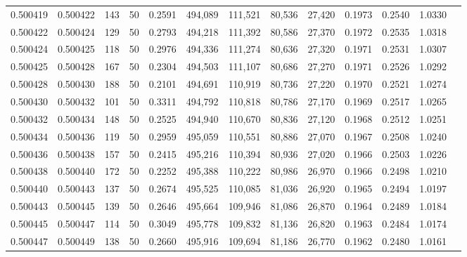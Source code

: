 \begin{tabular}{rrrrrrrrrrrrr}
0.500419 & 0.500422 & 143 &  50 &                                     0.2591 & 494,089 & 111,521 &  80,536 &  27,420 & 0.1973 & 0.2540 & 1.0330 \\
0.500422 & 0.500424 & 129 &  50 &                                     0.2793 & 494,218 & 111,392 &  80,586 &  27,370 & 0.1972 & 0.2535 & 1.0318 \\
0.500424 & 0.500425 & 118 &  50 &                                     0.2976 & 494,336 & 111,274 &  80,636 &  27,320 & 0.1971 & 0.2531 & 1.0307 \\
0.500425 & 0.500428 & 167 &  50 &                                     0.2304 & 494,503 & 111,107 &  80,686 &  27,270 & 0.1971 & 0.2526 & 1.0292 \\
0.500428 & 0.500430 & 188 &  50 &                                     0.2101 & 494,691 & 110,919 &  80,736 &  27,220 & 0.1970 & 0.2521 & 1.0274 \\
0.500430 & 0.500432 & 101 &  50 &                                     0.3311 & 494,792 & 110,818 &  80,786 &  27,170 & 0.1969 & 0.2517 & 1.0265 \\
0.500432 & 0.500434 & 148 &  50 &                                     0.2525 & 494,940 & 110,670 &  80,836 &  27,120 & 0.1968 & 0.2512 & 1.0251 \\
0.500434 & 0.500436 & 119 &  50 &                                     0.2959 & 495,059 & 110,551 &  80,886 &  27,070 & 0.1967 & 0.2508 & 1.0240 \\
0.500436 & 0.500438 & 157 &  50 &                                     0.2415 & 495,216 & 110,394 &  80,936 &  27,020 & 0.1966 & 0.2503 & 1.0226 \\
0.500438 & 0.500440 & 172 &  50 &                                     0.2252 & 495,388 & 110,222 &  80,986 &  26,970 & 0.1966 & 0.2498 & 1.0210 \\
0.500440 & 0.500443 & 137 &  50 &                                     0.2674 & 495,525 & 110,085 &  81,036 &  26,920 & 0.1965 & 0.2494 & 1.0197 \\
0.500443 & 0.500445 & 139 &  50 &                                     0.2646 & 495,664 & 109,946 &  81,086 &  26,870 & 0.1964 & 0.2489 & 1.0184 \\
0.500445 & 0.500447 & 114 &  50 &                                     0.3049 & 495,778 & 109,832 &  81,136 &  26,820 & 0.1963 & 0.2484 & 1.0174 \\
0.500447 & 0.500449 & 138 &  50 &                                     0.2660 & 495,916 & 109,694 &  81,186 &  26,770 & 0.1962 & 0.2480 & 1.0161 \\

\end{tabular}
